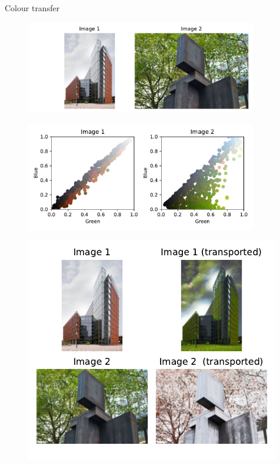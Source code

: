 \documentclass[pdf,aspectratio=169,10pt]{beamer}
\begin{document}
\begin{frame}[plain]{ Colour transfer}
\begin{minipage}{0.4\textwidth}
\vspace{1em}
    \begin{figure}
        \includegraphics[width=0.9\textwidth]{../img/ex1_original_images.pdf}
    \end{figure}

    \begin{figure}
        \includegraphics[width=0.9\textwidth]{../img/ex1_colour_histograms.pdf}
    \end{figure}
    
\end{minipage}
\hfill
\begin{minipage}{0.56\textwidth}
\qquad{}
    \begin{figure}
        \includegraphics[width=0.99\textwidth]{../img/ex1_result.pdf}
    \end{figure}
\end{minipage}


\end{frame}
\end{document}
